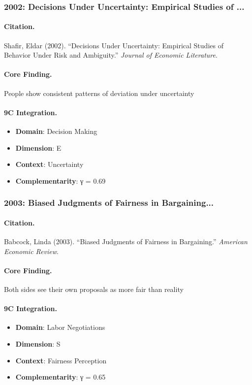 \subsubsection{2002: Decisions Under Uncertainty: Empirical Studies of ...}

\paragraph{Citation.}
Shafir, Eldar (2002). ``Decisions Under Uncertainty: Empirical Studies of Behavior Under Risk and Ambiguity.''
\textit{Journal of Economic Literature}.

\paragraph{Core Finding.}
People show consistent patterns of deviation under uncertainty

\paragraph{9C Integration.}
\begin{itemize}[nosep]
  \item \textbf{Domain}: Decision Making
  \item \textbf{Dimension}: E
  \item \textbf{Context}: Uncertainty
  \item \textbf{Complementarity}: γ = 0.69
\end{itemize}

\subsubsection{2003: Biased Judgments of Fairness in Bargaining...}

\paragraph{Citation.}
Babcock, Linda (2003). ``Biased Judgments of Fairness in Bargaining.''
\textit{American Economic Review}.

\paragraph{Core Finding.}
Both sides see their own proposals as more fair than reality

\paragraph{9C Integration.}
\begin{itemize}[nosep]
  \item \textbf{Domain}: Labor Negotiations
  \item \textbf{Dimension}: S
  \item \textbf{Context}: Fairness Perception
  \item \textbf{Complementarity}: γ = 0.65
\end{itemize}

